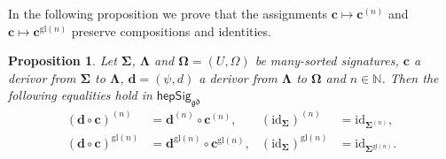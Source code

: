 \documentclass[a4paper, reqno
]{amsart}
\newcommand{\sig}[1]{\mathbf{#1}}             %
\newcommand{\id}{\mathrm{id}}
\newcommand{\gd}{\mathfrak{gd}}              %
\newcommand{\gl}{\mathrm{gl}}                %
\theoremstyle{plain}
\newtheorem{proposition}[theorem]{Proposition}
\theoremstyle{definition}
\begin{document}
In the following proposition we prove that the assignments $\mathbf{c}\mapsto\mathbf{c}^{(n)}$ and $\mathbf{c}\mapsto\mathbf{c}^{\gl(n)}$ preserve compositions and identities.

\begin{proposition}\label{PChangeSigCat}
Let $\sig{\Sigma}$, $\sig{\Lambda}$ and $\sig{\Omega}=(U,\Omega)$ be many-sorted signatures, $\mathbf{c}$ a derivor from $\sig{\Sigma}$ to $\sig{\Lambda}$, $\mathbf{d}=(\psi,d)$ a derivor from $\sig{\Lambda}$ to $\sig{\Omega}$ and $n\in\mathbb{N}$.
Then the following equalities hold in $\mathsf{hepSig}_{\gd}$
\begin{align*}
(\mathbf{d}\circ\mathbf{c})^{(n)}&=\mathbf{d}^{(n)}\circ\mathbf{c}^{(n)},
&
(\id_{\sig{\Sigma}})^{(n)}&=\id_{\sig{\Sigma}^{(n)}},
\\
(\mathbf{d}\circ\mathbf{c})^{\gl(n)}&=\mathbf{d}^{\gl(n)}\circ\mathbf{c}^{\gl(n)},
&
(\id_{\sig{\Sigma}})^{\gl(n)}&=\id_{\sig{\Sigma}^{\gl(n)}}.
\end{align*}
\end{proposition}
\end{document}
